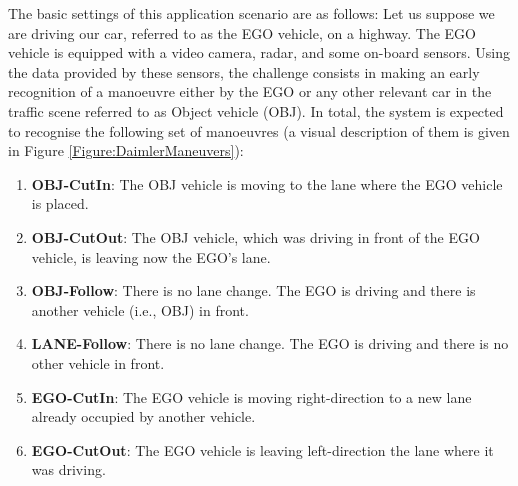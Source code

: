 The basic settings of this application scenario are as follows: Let us suppose we are driving our car, referred to as the EGO vehicle, on a highway. The EGO vehicle is equipped with a video camera, radar, and some on-board sensors. Using the data provided by these sensors, the challenge consists in making an early recognition of a manoeuvre either by the EGO or any other relevant car in the traffic scene referred to as Object vehicle (OBJ). In total, the system is expected to recognise the following set of manoeuvres (a visual description of them is given in Figure \ref{Figure:DaimlerManeuvers}):

\begin{enumerate}
\item \textbf{OBJ-CutIn}: The OBJ vehicle is moving to the lane where the EGO vehicle is placed.
\item \textbf{OBJ-CutOut}: The OBJ vehicle, which was driving in front of the EGO vehicle, is leaving now the EGO's lane.
\item \textbf{OBJ-Follow}: There is no lane change. The EGO is driving and there is another vehicle (i.e., OBJ) in front.
\item \textbf{LANE-Follow}: There is no lane change. The EGO is driving and there is no other vehicle in front.
\item \textbf{EGO-CutIn}: The EGO vehicle is moving right-direction to a new lane already occupied by another vehicle. 
\item \textbf{EGO-CutOut}: The EGO vehicle is leaving left-direction the lane where it was driving.
\end{enumerate}

